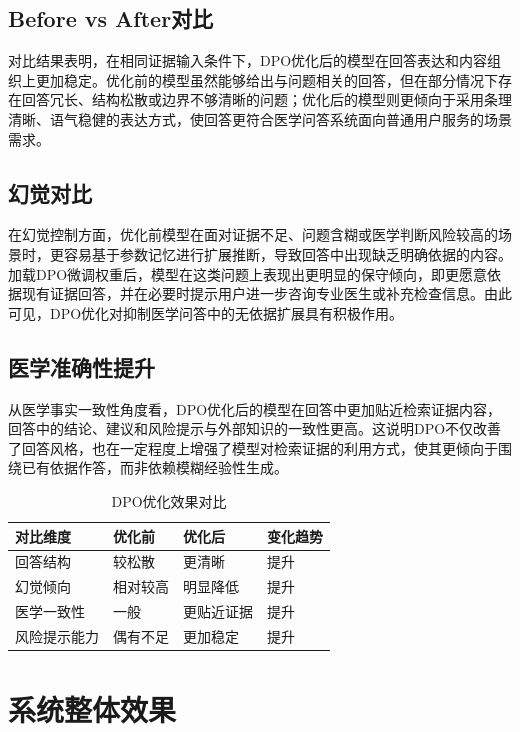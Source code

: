 \subsection{Before vs After对比}

对比结果表明，在相同证据输入条件下，DPO优化后的模型在回答表达和内容组织上更加稳定。优化前的模型虽然能够给出与问题相关的回答，但在部分情况下存在回答冗长、结构松散或边界不够清晰的问题；优化后的模型则更倾向于采用条理清晰、语气稳健的表达方式，使回答更符合医学问答系统面向普通用户服务的场景需求。

\subsection{幻觉对比}

在幻觉控制方面，优化前模型在面对证据不足、问题含糊或医学判断风险较高的场景时，更容易基于参数记忆进行扩展推断，导致回答中出现缺乏明确依据的内容。加载DPO微调权重后，模型在这类问题上表现出更明显的保守倾向，即更愿意依据现有证据回答，并在必要时提示用户进一步咨询专业医生或补充检查信息。由此可见，DPO优化对抑制医学问答中的无依据扩展具有积极作用。

\subsection{医学准确性提升}

从医学事实一致性角度看，DPO优化后的模型在回答中更加贴近检索证据内容，回答中的结论、建议和风险提示与外部知识的一致性更高。这说明DPO不仅改善了回答风格，也在一定程度上增强了模型对检索证据的利用方式，使其更倾向于围绕已有依据作答，而非依赖模糊经验性生成。

\begin{table}[htbp]
    \caption[DPO优化效果对比]{DPO优化效果对比}
    \centering
    \begin{tabular}{llll}
        \toprule
        对比维度 & 优化前 & 优化后 & 变化趋势 \\
        \midrule
        回答结构 & 较松散 & 更清晰 & 提升 \\
        幻觉倾向 & 相对较高 & 明显降低 & 提升 \\
        医学一致性 & 一般 & 更贴近证据 & 提升 \\
        风险提示能力 & 偶有不足 & 更加稳定 & 提升 \\
        \bottomrule
    \end{tabular}
    \label{tab:dpo-compare}
\end{table}

\section{系统整体效果}

